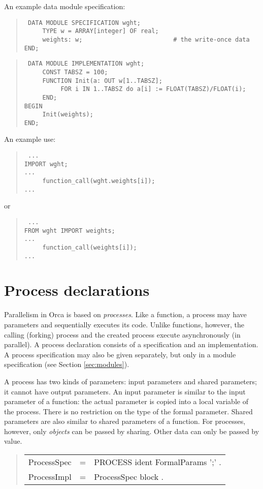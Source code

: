 \documentclass[10pt]{article}
\newenvironment{grammar}
{\begin{quote} \begin{tabular}{p{3.8cm} l l}}
{\end{tabular}\end{quote}}
\begin{document}
An example data module specification:
\begin{quote}\tt
DATA MODULE SPECIFICATION wght; \\
\mbox{~~~~~}TYPE w = ARRAY[integer] OF real; \\
\mbox{~~~~~}weights:~w;~~~~~~~~~~~~~~~~~~~~~~~~~\# the write-once data \\
END; \\
\end{quote}
\begin{quote}\tt
DATA MODULE IMPLEMENTATION wght; \\
\mbox{~~~~~}CONST TABSZ = 100; \\
\mbox{~~~~~}FUNCTION Init(a:~OUT w[1..TABSZ]; \\
\mbox{~~~~~~~~~~}FOR i IN 1..TABSZ do a[i] := FLOAT(TABSZ)/FLOAT(i); \\
\mbox{~~~~~}END; \\
BEGIN \\
\mbox{~~~~~}Init(weights); \\
END;
\end{quote}
An example use:
\begin{quote}\tt
... \\
IMPORT wght; \\
... \\
\mbox{~~~~~}function\_call(wght.weights[i]); \\
...
\end{quote}
or
\begin{quote}\tt
... \\
FROM wght IMPORT weights; \\
... \\
\mbox{~~~~~}function\_call(weights[i]); \\
... 
\end{quote}
\section{Process declarations}\label{sec:processes}

Parallelism in Orca is based on {\em processes}.
Like a function, a process may have parameters and sequentially
executes its code.
Unlike functions, however, the calling (forking) process and the created
process execute asynchronously (in parallel).
A process declaration consists of a specification and an implementation.
A process specification may also be given separately, but only in a module
specification (see Section \ref{sec:modules}).

A process has two kinds of parameters: input parameters and shared
parameters; it cannot have output parameters.
An input parameter is similar to the input parameter of a function:
the actual parameter is copied into a local variable of the process.
There is no restriction on the type of the formal parameter.
Shared parameters are also similar to shared parameters of a function.
For processes, however, only {\em objects} can be passed by sharing.
Other data can only be passed by value.
\begin{grammar}
ProcessSpec & = & PROCESS ident FormalParams ';' . \\
ProcessImpl & = & ProcessSpec block . \\
\end{grammar}
\end{document}
